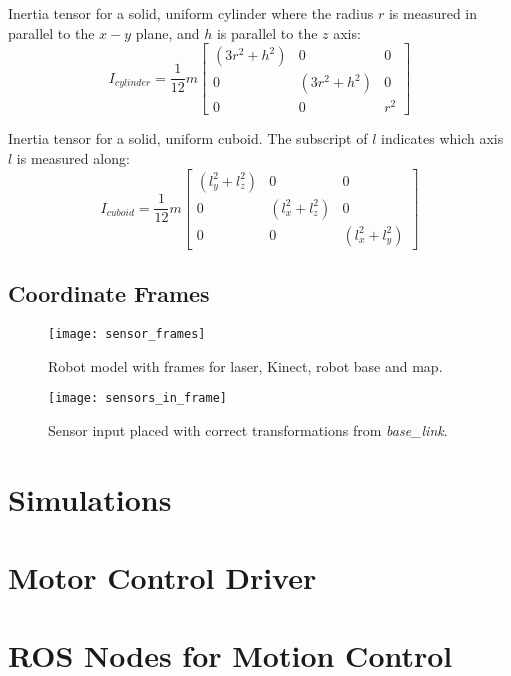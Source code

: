 Inertia tensor for a solid, uniform cylinder where the radius $r$ is measured in parallel to the $x - y$ plane, and $h$ is parallel to the $z$ axis:
\begin{equation}
I_{cylinder} = \frac{1}{12}m \begin{bmatrix}
	(3 r^2 + h^2) & 0 & 0 \\[0.3em]
	0 & (3 r^2 + h^2) & 0 \\[0.3em]
	0 & 0 & r^2
	\end{bmatrix}
\end{equation}

Inertia tensor for a solid, uniform cuboid. The subscript of $l$ indicates which axis $l$ is measured along:
\begin{equation}
I_{cuboid} = \frac{1}{12}m \begin{bmatrix}
	(l_y^2 + l_z^2) & 0 & 0 \\[0.3em]
	0 & (l_x^2 + l_z^2) & 0 \\[0.3em]
	0 & 0 & (l_x^2 + l_y^2)
\end{bmatrix}
\end{equation}

\subsection{Coordinate Frames}

\begin{figure}[p]
	\centering
	\texttt{[image: sensor\_frames]}
	\caption{Robot model with frames for laser, Kinect, robot base and map. }
	\label{fig:sensor_frames}
\end{figure}

\begin{figure}[p]
	\centering
	\texttt{[image: sensors\_in\_frame]}
	\caption{Sensor input placed with correct transformations from \textit{base\_link}. }
	\label{fig:sensors_in_frame}
\end{figure}


\section{Simulations}

\section{Motor Control Driver}

\section{ROS Nodes for Motion Control}


